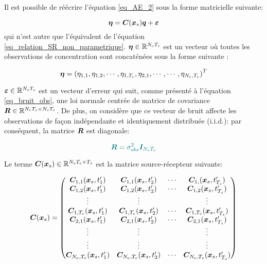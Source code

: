 Il est possible de réécrire l'équation \eqref{eq_AE_2} sous la forme matricielle suivante:

\begin{equation}
{\bm{\eta}} = {\bm{C}}({\bm{x}_s}){\bm{q}} + {\bm{\varepsilon}}
\label{eq_AE_3}
\end{equation}
qui n'est autre que l'équivalent de l'équation \eqref{eq_relation_SR_non_parametrique}. ${\bm{\eta}} \in \mathbb{R}^{N_cT_c}$ est un vecteur où toutes les observations de concentration sont concaténées sous la forme suivante : 

\begin{equation}
{\bm{\eta}} = \left({\eta}_{1,1}, {\eta}_{1,2}, \cdots, {\eta}_{1,T_c}, {\eta}_{2,1}, \cdots, \cdots, {\eta}_{N_c,T_c}\right)^T
\label{eq_AE_3_plus}
\end{equation}

${\bm{\varepsilon}} \in \mathbb{R}^{N_cT_c}$ est un vecteur d'erreur qui suit, comme présenté à l'équation \eqref{eq_bruit_obs}, une loi normale centrée de matrice de covariance ${\bm{R}} \in \mathbb{R}^{N_cT_c \times N_cT_c}$. De plus, on considère que ce vecteur de bruit affecte les observations de façon indépendante et identiquement distribuée (i.i.d.): par conséquent, la matrice ${\bm{R}}$ est diagonale: 


\begin{equation}
	\NdFS{
		\MatR = \varObs \MatId_{N_c T_c}
		}
\end{equation}

Le terme ${\bm{C}}({\bm{x}_s}) \in \mathbb{R}^{N_cT_c \times T_s}$ est la matrice source-récepteur suivante:

\begin{equation}
{\bm{C}}({\bm{x}_s}) = 
\begin{pmatrix}
{\bm{C}}_{1,1}({\bm{x}_s}, t'_1) & {\bm{C}}_{1,1}({\bm{x}_s}, t'_2)  & \cdots & {\bm{C}}_{1,}({\bm{x}_s}, t'_{T_s}) \\ 
{\bm{C}}_{1,2}({\bm{x}_s}, t'_1) & {\bm{C}}_{1,2}({\bm{x}_s}, t'_2)  & \cdots & {\bm{C}}_{1,2}({\bm{x}_s}, t'_{T_s}) \\
\vdots & \vdots &  & \vdots \\
{\bm{C}}_{1,T_c}({\bm{x}_s}, t'_1) & {\bm{C}}_{1,T_c}({\bm{x}_s}, t'_2)  & \cdots & {\bm{C}}_{1,T_c}({\bm{x}_s}, t'_{T_s}) \\
{\bm{C}}_{2,1}({\bm{x}_s}, t'_1) & {\bm{C}}_{2,1}({\bm{x}_s}, t'_2)  & \cdots & {\bm{C}}_{2,1}({\bm{x}_s}, t'_{T_s}) \\
\vdots & \vdots &  & \vdots \\
\vdots & \vdots &  & \vdots \\
{\bm{C}}_{N_c,T_c}({\bm{x}_s},  t'_1) & {\bm{C}}_{N_c,T_c}({\bm{x}_s},  t'_2)  & \cdots & {\bm{C}}_{N_c,T_c}({\bm{x}_s},  t'_{T_s}) \\
\end{pmatrix}
\label{eq_AE_4}
\end{equation}

